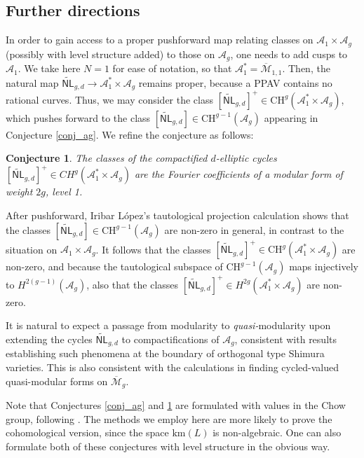 \documentclass[12pt]{amsart}
\def\cA{\mathcal{A}}
\def\cM{\mathcal{M}}
\def\barM{\overline{\cM}}
\newcommand{\A}{\mathcal A}
\newcommand{\CH}{\mathrm{CH}}
\newcommand{\wNL}{{\widetilde{\mathsf{NL}}}}
\newcommand{\km}{\mathrm{km}}
\newtheorem{conj}{Conjecture}
\theoremstyle{definition}
\begin{document}
\subsection{Further directions}

In order to gain access to a proper pushforward map relating classes on $\cA_1\times\cA_g$ (possibly with level structure added) to those on $\cA_g$, one needs to add cusps to $\cA_1$. We take here $N=1$ for ease of notation, so that $\cA_1^{*}=\barM_{1,1}$. Then, the natural map $\wNL_{g,d}\to \cA_1^{*}\times\cA_g$ remains proper, because a PPAV contains no rational curves. Thus, we may consider the class $[\wNL_{g,d}]^+\in \CH^{g}(\cA_1^{*}\times\cA_g)$, which pushes forward to the class $[\wNL_{g,d}]\in \CH^{g-1}(\cA_g)$ appearing in Conjecture \ref{conj_ag}. We refine the conjecture as follows:

\begin{conj}\label{quasimod}
    The classes of the compactified $d$-elliptic cycles $[\wNL_{g,d}]^+\in CH^{g}(\A_1^* \times \A_g)$ are the Fourier coefficients of a modular form of weight $2g$, level 1.
\end{conj}

After pushforward, Iribar L\'{o}pez's tautological projection calculation \cite{il} shows that the classes $[\wNL_{g,d}]\in\CH^{g-1}(\cA_g)$ are non-zero in general, in contrast to the situation on $\cA_1\times\cA_g$. It follows that the classes $[\wNL_{g,d}]^{+}\in \CH^{g}(\cA_1^{*}\times\cA_g)$ are non-zero, and because the tautological subspace of $\CH^{g-1}(\cA_g)$ maps injectively to $H^{2(g-1)}(\cA_g)$, also that the classes $[\wNL_{g,d}]^{+}\in H^{2g}(\cA_1^{*}\times\cA_g)$ are non-zero. 

It is natural to expect a passage from modularity to \emph{quasi-}modularity upon extending the cycles $\wNL_{g,d}$ to compactifications of $\cA_g$, consistent with results \cite{egt,gar} establishing such phenomena at the boundary of orthogonal type Shimura varieties. This is also consistent with the calculations in \cite{lian_d-ell,obpix} finding cycled-valued quasi-modular forms on $\barM_g$.

Note that Conjectures \ref{conj_ag} and \ref{quasimod} are formulated with values in the Chow group, following \cite{pand_notes_24,il}. The methods we employ here are more likely to prove the cohomological version, since the space $\km(L)$ is non-algebraic. One can also formulate both of these conjectures with level structure in the obvious way.
\end{document}

